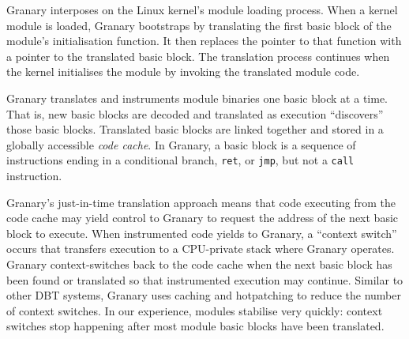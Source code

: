 \documentclass[preprint]{sigplanconf}
\begin{document}



Granary interposes on the Linux kernel's module loading process. When a kernel module is loaded, Granary bootstraps by translating the first basic block of the module's initialisation function.  It then replaces the pointer to that function with a pointer to the translated basic block. The translation process continues when the kernel initialises the module by invoking the translated module code.

Granary translates and instruments module binaries one basic block at a time. That is, new basic blocks are decoded and translated as execution ``discovers'' those basic blocks. Translated basic blocks are linked together and stored in a globally accessible \emph{code cache}. In Granary, a basic block is a sequence of instructions ending in a conditional branch, \texttt{ret}, or \texttt{jmp}, but not a \texttt{call} instruction.

Granary's just-in-time translation approach means that code executing from the code cache may yield control to Granary to request the address of the next basic block to execute. When instrumented code yields to Granary, a ``context switch'' occurs that transfers execution to a CPU-private stack where Granary operates. Granary context-switches back to the code cache when the next basic block has been found or translated so that instrumented execution may continue. Similar to other DBT systems, Granary uses caching and hotpatching to reduce the number of context switches. In our experience, modules stabilise very quickly: context switches stop happening after most module basic blocks have been translated.
\end{document}
